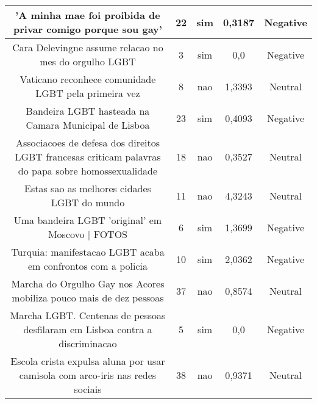 \documentclass[11pt]{article}
\newlength\mylength
\begin{document}
\begin{center}
\begin{longtable}{||C{.40\mylength}||C{.20\mylength}||C{.20\mylength}||C{.30\mylength}||C{.20\mylength}||}
   'A minha mae foi proibida de privar comigo porque sou gay'  & 22 & sim & 0,3187 & Negative \\  \hline
   Cara Delevingne assume relacao no mes do orgulho LGBT  & 3 & sim & 0,0 & Negative \\  \hline
   Vaticano reconhece comunidade LGBT pela primeira vez  & 8 & nao & 1,3393 & Neutral \\  \hline
   Bandeira LGBT hasteada na Camara Municipal de Lisboa  & 23 & sim & 0,4093 & Negative \\  \hline
   Associacoes de defesa dos direitos LGBT francesas criticam palavras do papa sobre homossexualidade  & 18 & nao & 0,3527 & Neutral \\  \hline
   Estas sao as melhores cidades LGBT do mundo  & 11 & nao & 4,3243 & Neutral \\  \hline
   Uma bandeira LGBT 'original' em Moscovo | FOTOS  & 6 & sim & 1,3699 & Negative \\  \hline
   Turquia: manifestacao LGBT acaba em confrontos com a policia  & 10 & sim & 2,0362 & Negative \\  \hline
   Marcha do Orgulho Gay nos Acores mobiliza pouco mais de dez pessoas  & 37 & nao & 0,8574 & Neutral \\  \hline
   Marcha LGBT. Centenas de pessoas desfilaram em Lisboa contra a discriminacao  & 5 & sim & 0,0 & Negative \\  \hline
   Escola crista expulsa aluna por usar camisola com arco-iris nas redes sociais  & 38 & nao & 0,9371 & Neutral \\  \hline

\end{longtable}
\end{center}
\end{document}
